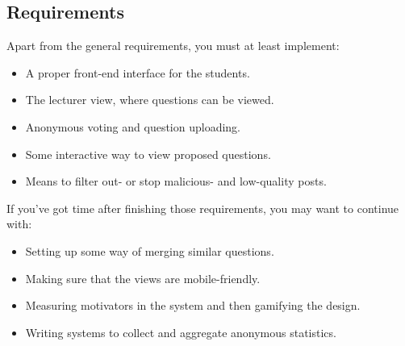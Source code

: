 \begin{refsection}
\subsection*{Requirements}
Apart from the general requirements, you must at least implement:
\begin{itemize}
    \item A proper front-end interface for the students.
	\item The lecturer view, where questions can be viewed.
	\item Anonymous voting and question uploading.
    \item Some interactive way to view proposed questions.
    \item Means to filter out- or stop malicious- and low-quality posts.
\end{itemize}
If you've got time after finishing those requirements, you may want to continue with:
\begin{itemize}
    \item Setting up some way of merging similar questions.
    \item Making sure that the views are mobile-friendly.
	\item Measuring motivators in the system and then gamifying the design.
	\item Writing systems to collect and aggregate anonymous statistics.
\end{itemize}
\end{refsection}

